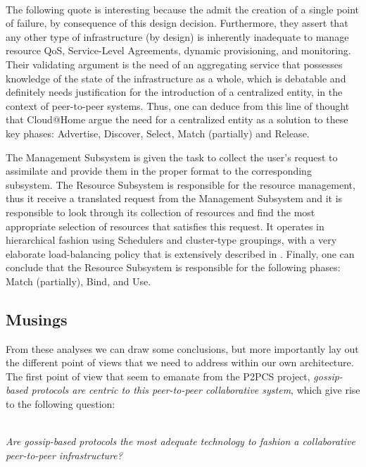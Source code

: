 \documentclass[11pt]{amsart}
\begin{document}
        \\ The following quote is interesting because the admit the creation of a single
        point of failure, by consequence of this design decision. Furthermore, they assert
        that any other type of infrastructure (by design) is inherently inadequate to
        manage resource QoS, Service-Level Agreements, dynamic provisioning, and
        monitoring. Their validating argument is the need of an aggregating service that
        possesses knowledge of the state of the infrastructure as a whole, which is
        debatable and definitely needs justification for the introduction of a centralized
        entity, in the context of peer-to-peer systems. Thus, one can deduce from this
        line of thought that Cloud@Home argue the need for a centralized entity as a
        solution to these key phases: Advertise, Discover, Select, Match (partially) and
        Release.
        
        The Management Subsystem is given the task to collect the user's request to
        assimilate and provide them in the proper format to the corresponding
        subsystem. The Resource Subsystem is responsible for the resource management, thus
        it receive a translated request from the Management Subsystem and it is
        responsible to look through its collection of resources and find the most
        appropriate selection of resources that satisfies this request. It operates in
        hierarchical fashion using Schedulers and cluster-type groupings, with a very
        elaborate load-balancing policy that is extensively described in
        \cite{cathome9}. Finally, one can conclude that the Resource Subsystem is
        responsible for the following phases: Match (partially), Bind, and Use.

        \subsection{Musings}
        From these analyses we can draw some conclusions, but more importantly lay out the
        different point of views that we need to address within our own architecture. The
        first point of view that seem to emanate from the P2PCS project,
        \emph{gossip-based protocols are centric to this peer-to-peer collaborative
          system}, which give rise to the following question:
        
        \\ \emph{Are gossip-based protocols the most adequate technology to fashion a
          collaborative peer-to-peer infrastructure?}
\end{document}
